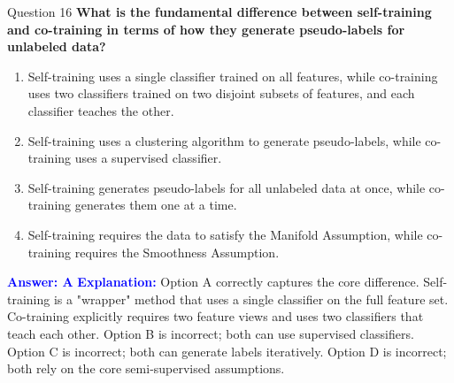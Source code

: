 \documentclass{beamer}
\begin{document}
	\begin{frame}{Question 16}
		\textbf{What is the fundamental difference between self-training and co-training in terms of how they generate pseudo-labels for unlabeled data?}
		\begin{enumerate}
			\item Self-training uses a single classifier trained on all features, while co-training uses two classifiers trained on two disjoint subsets of features, and each classifier teaches the other.
			\item Self-training uses a clustering algorithm to generate pseudo-labels, while co-training uses a supervised classifier.
			\item Self-training generates pseudo-labels for all unlabeled data at once, while co-training generates them one at a time.
			\item Self-training requires the data to satisfy the Manifold Assumption, while co-training requires the Smoothness Assumption.
		\end{enumerate}
		\vspace{0.2cm}
		\textcolor{blue}{\textbf{Answer: A}}
		\vspace{0.2cm}
		\textcolor{blue}{\textbf{Explanation:}} Option A correctly captures the core difference. Self-training is a "wrapper" method that uses a single classifier on the full feature set. Co-training explicitly requires two feature views and uses two classifiers that teach each other. Option B is incorrect; both can use supervised classifiers. Option C is incorrect; both can generate labels iteratively. Option D is incorrect; both rely on the core semi-supervised assumptions.
	\end{frame}
	
\end{document}
